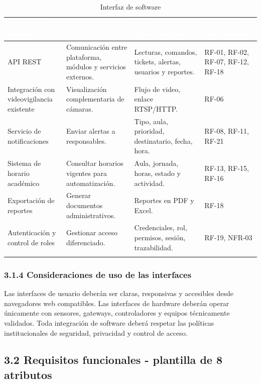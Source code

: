 \begingroup
\small
\begin{longtable}{|p{3.9cm}|p{3.9cm}|p{3.9cm}|p{3.9cm}|}
\hline
\cellcolor{sigagreen}\textcolor{white}{\textbf{Interfaz de software}} & \cellcolor{sigagreen}\textcolor{white}{\textbf{Función}} & \cellcolor{sigagreen}\textcolor{white}{\textbf{Datos intercambiados}} & \cellcolor{sigagreen}\textcolor{white}{\textbf{Requisitos relacionados}} \\ \hline
API REST & Comunicación entre plataforma, módulos y servicios externos. & Lecturas, comandos, tickets, alertas, usuarios y reportes. & RF-01, RF-02, RF-07, RF-12, RF-18 \\ \hline
Integración con videovigilancia existente & Visualización complementaria de cámaras. & Flujo de video, enlace RTSP/HTTP. & RF-06 \\ \hline
Servicio de notificaciones & Enviar alertas a responsables. & Tipo, aula, prioridad, destinatario, fecha, hora. & RF-08, RF-11, RF-21 \\ \hline
Sistema de horario académico & Consultar horarios vigentes para automatización. & Aula, jornada, horas, estado y actividad. & RF-13, RF-15, RF-16 \\ \hline
Exportación de reportes & Generar documentos administrativos. & Reportes en PDF y Excel. & RF-18 \\ \hline
Autenticación y control de roles & Gestionar acceso diferenciado. & Credenciales, rol, permisos, sesión, trazabilidad. & RF-19, NFR-03 \\ \hline
\caption{Interfaz de software}
\end{longtable}
\endgroup

\subsubsection*{3.1.4 Consideraciones de uso de las interfaces}


Las interfaces de usuario deberán ser claras, responsivas y accesibles desde navegadores web compatibles. Las interfaces de hardware deberán operar únicamente con sensores, gateways, controladores y equipos técnicamente validados. Toda integración de software deberá respetar las políticas institucionales de seguridad, privacidad y control de acceso.


\subsection*{3.2 Requisitos funcionales - plantilla de 8 atributos}

